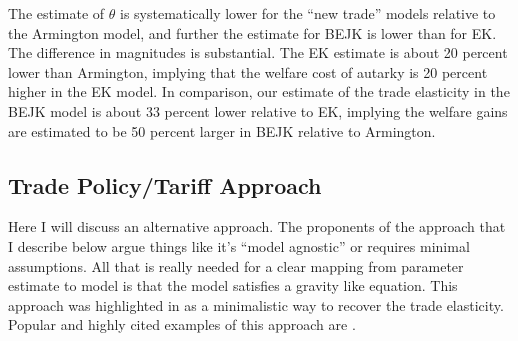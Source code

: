 \documentclass[pdftex,12pt]{article}
\begin{document}
The estimate of $\theta$ is systematically lower for the ``new trade'' models relative to the Armington model, and further the estimate for BEJK is lower than for EK. The difference in magnitudes is substantial. The EK estimate is about 20 percent lower than Armington, implying that the welfare cost of autarky is 20 percent higher in the EK model. In comparison, our estimate of the trade elasticity in the BEJK model is about 33 percent lower relative to EK, implying the welfare gains are estimated to be 50 percent larger in BEJK relative to Armington.

\subsection{Trade Policy/Tariff Approach}

Here I will discuss an alternative approach. The proponents of the approach that I describe below argue things like it's ``model agnostic'' or requires minimal assumptions. All that is really needed for a clear mapping from parameter estimate to model is that the model satisfies a gravity like equation. This approach was highlighted in \citet{arkolakis2012new} as a minimalistic way to recover the trade elasticity. Popular and highly cited examples of this approach are \citet{caliendo2014estimates}.
\end{document}
